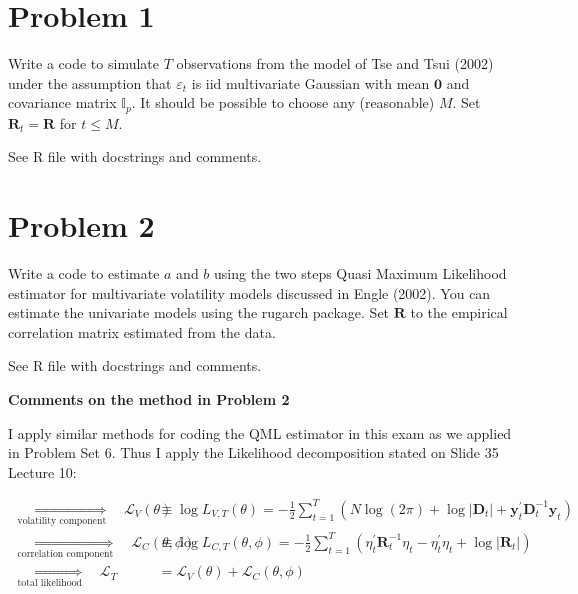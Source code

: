\documentclass{EconHomework}
\begin{document}
\section{Problem 1}
\begin{tcolorbox}[colback=white]
    Write a code to simulate $T$ observations from the model of Tse and Tsui (2002) under the assumption that $\varepsilon_{t}$ is iid multivariate Gaussian with mean $\mathbf{0}$ and covariance matrix $\mathbb{I}_{p} .$ It should be possible to choose any (reasonable) $M .$ Set $\mathbf{R}_{t}=\mathbf{R}$ for $t \leq M .$
\end{tcolorbox}

See R file with docstrings and comments.

\section{Problem 2}
\begin{tcolorbox}[colback=white]
    Write a code to estimate $a$ and $b$ using the two steps Quasi Maximum Likelihood estimator for multivariate volatility models discussed in Engle (2002). You can estimate the univariate models using the rugarch package. Set $\mathbf{R}$ to the empirical correlation matrix estimated from the data.
\end{tcolorbox}

See R file with docstrings and comments.

\begin{tcolorbox}
    \textbf{Comments on the method in Problem 2}
    
    \bigskip
    
    I apply similar methods for coding the QML estimator in this exam as we applied in Problem Set 6. Thus I apply the Likelihood decomposition stated on Slide 35 Lecture 10:
    
    \begin{align*}
        \underset{\text{volatility component}}{\Longrightarrow}\quad\mathcal{L}_{V}(\theta)&\equiv\log L_{V,T}(\theta)=-\frac{1}{2}\sum_{t=1}^{T}\left(N\log(2\pi)+\log\left|\mathbf{D}_{t}\right|+\mathbf{y}_{t}^{\prime}\mathbf{D}_{t}^{-1}\mathbf{y}_{t}\right)\\\underset{\text{correlation component}}{\Longrightarrow}\quad\mathcal{L}_{C}(\theta,\phi)&\equiv\log L_{C,T}(\theta,\phi)=-\frac{1}{2}\sum_{t=1}^{T}\left(\eta_{t}^{\prime}\mathbf{R}_{t}^{-1}\eta_{t}-\eta_{t}^{\prime}\eta_{t}+\log\left|\mathbf{R}_{t}\right|\right)\\\underset{\text{total likelihood}}{\Longrightarrow}\quad\mathcal{L}_{T}&=\mathcal{L}_{V}(\theta)+\mathcal{L}_{C}(\theta,\phi)
    \end{align*}
\end{tcolorbox}
\end{document}
